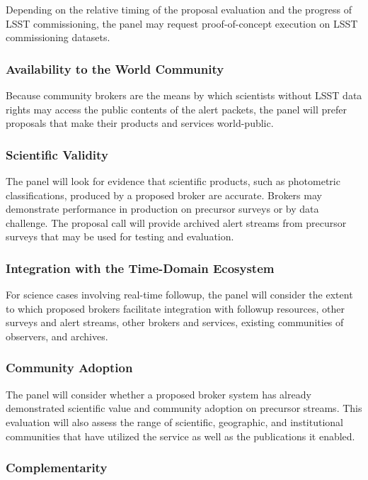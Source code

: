 Depending on the relative timing of the proposal evaluation and the progress of LSST commissioning, the panel may request proof-of-concept execution on LSST commissioning datasets.

\subsubsection{Availability to the World Community}

Because community brokers are the means by which scientists without LSST data rights may access the public contents of the alert packets, the panel will prefer proposals that make their products and services world-public.

\subsubsection{Scientific Validity}

The panel will look for evidence that scientific products, such as photometric classifications, produced by a proposed broker are accurate.  
Brokers may demonstrate performance in production on precursor surveys or by data challenge.
The proposal call will provide archived alert streams from precursor surveys that may be used for testing and evaluation.

\subsubsection{Integration with the Time-Domain Ecosystem}

For science cases involving real-time followup, the panel will consider the extent to which proposed brokers facilitate integration with followup resources, other surveys and alert streams, other brokers and services, existing communities of observers, and archives.  	


\subsubsection{Community Adoption}

The panel will consider whether a proposed broker system has already demonstrated scientific value and community adoption on precursor streams.  
This evaluation will also assess the 
range of scientific, geographic, and institutional communities that have utilized the service as well as the publications it enabled.


\subsubsection{Complementarity}

